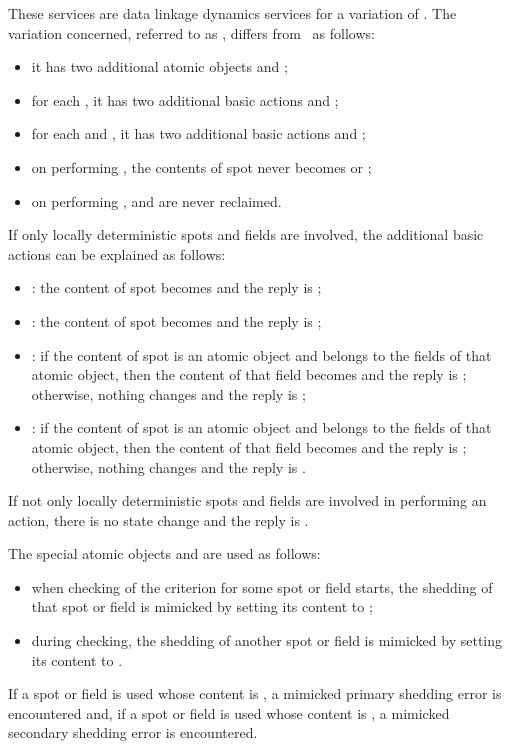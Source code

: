 \documentclass[fleqn]{llncs}
\begin{document}
These services are data linkage dynamics services for a variation of
\DLD.
The variation concerned, referred to as \DLDm, differs from \DLD\ as
follows:
\begin{itemize}
\item
it has two additional atomic objects  and ;
\item
for each , it has two additional basic actions
 and ;
\item
for each  and , it has two additional basic
actions  and ;
\item
on performing , the contents of spot  never becomes
 or ;
\item
on performing ,  and  are never reclaimed.
\end{itemize}

If only locally deterministic spots and fields are involved, the
additional basic actions can be explained as follows:
\begin{itemize}
\item
:
the content of spot  becomes  and the reply is ;
\item
:
the content of spot  becomes  and the reply is ;
\item
:
if the content of spot  is an atomic object and  belongs to the
fields of that atomic object, then the content of that field becomes
 and the reply is ; otherwise, nothing changes and the
reply is ;
\item
:
if the content of spot  is an atomic object and  belongs to the
fields of that atomic object, then the content of that field becomes
 and the reply is ; otherwise, nothing changes and the
reply is .
\end{itemize}
If not only locally deterministic spots and fields are involved in
performing an action, there is no state change and the reply is
.

The special atomic objects  and  are used as follows:
\begin{itemize}
\item
when checking of the criterion for some spot or field starts, the
shedding of that spot or field is mimicked by setting its content to
;
\item
during checking, the shedding of another spot or field is mimicked by
setting its content to .
\end{itemize}
If a spot or field is used whose content is , a mimicked primary
shedding error is encountered and, if a spot or field is used whose
content is , a mimicked secondary shedding error is encountered.
\end{document}
